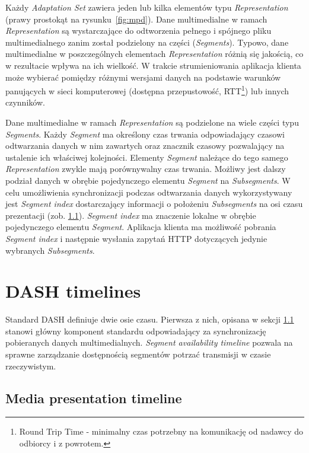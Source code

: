 Każdy \textit{Adaptation Set} zawiera jeden lub kilka elementów typu \textit{Representation} (prawy prostokąt na rysunku~\ref{fig:mpd}). Dane multimedialne w ramach \textit{Representation} są wystarczające do odtworzenia pełnego i spójnego pliku multimedialnego zanim został podzielony na części (\textit{Segments}). Typowo, dane multimedialne w poszczególnych elementach \textit{Representation} różnią się jakością, co w rezultacie wpływa na ich wielkość. W trakcie strumieniowania aplikacja klienta może wybierać pomiędzy różnymi wersjami danych na podstawie warunków panujących w sieci komputerowej (dostępna przepustowość, RTT\footnote{Round Trip Time - minimalny czas potrzebny na komunikację od nadawcy do odbiorcy i z powrotem.}) lub innych czynników.

Dane multimedialne w ramach \textit{Representation} są podzielone na wiele części typu \textit{Segments}. Każdy \textit{Segment} ma określony czas trwania odpowiadający czasowi odtwarzania danych w nim zawartych oraz znacznik czasowy pozwalający na ustalenie ich właściwej kolejności. Elementy \textit{Segment} należące do tego samego \textit{Representation} zwykle mają porównywalny czas trwania. Możliwy jest dalszy podział danych w obrębie pojedynczego elementu \textit{Segment} na \textit{Subsegments}. W celu umożliwienia synchronizacji podczas odtwarzania danych wykorzystywany jest \textit{Segment index} dostarczający informacji o położeniu \textit{Subsegments} na osi czasu prezentacji (zob. \ref{subsec:presentationtimeline}). \textit{Segment index} ma znaczenie lokalne w obrębie pojedynczego elementu \textit{Segment}. Aplikacja klienta ma możliwość pobrania \textit{Segment index} i następnie wysłania zapytań HTTP dotyczących jedynie wybranych \textit{Subsegments}.

\section{DASH timelines}

Standard DASH definiuje dwie osie czasu. Pierwsza z nich, opisana w sekcji \ref{subsec:presentationtimeline} stanowi główny komponent standardu odpowiadający za synchronizację pobieranych danych multimedialnych. \textit{Segment availability timeline} pozwala na sprawne zarządzanie dostępnością segmentów potrzać transmisji w czasie rzeczywistym.

\subsection{Media presentation timeline}
\label{subsec:presentationtimeline}

